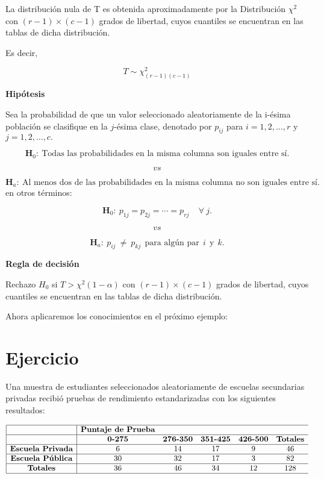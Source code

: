 \documentclass[
  a4paper,
  oneside,
  openany]{book}
\begin{document}
La distribución nula de T es obtenida aproximadamente por la Distribución \(\chi^2\) con \((r-1)\times(c-1)\) grados de libertad, cuyos cuantiles se encuentran en las tablas de dicha distribución.

Es decir,

\[T\sim \chi^2_{(r-1)(c-1)}\]

\textbf{Hipótesis}

Sea la probabilidad de que un valor seleccionado aleatoriamente de la i-ésima población se clasifique en la \(j\)-ésima clase, denotado por \(p_{ij}\) para \(i= 1, 2,\ldots,r\) y \(j=1,2,\ldots,c.\)

\[\textbf{H}_0: \ \mbox{Todas las probabilidades en la misma columna son iguales entre sí.}\]

\[vs\]

\[\textbf{H}_a: \ \mbox{Al menos dos de las probabilidades en la misma columna no son iguales entre sí.}\]
en otros términos:

\[\textbf{H}_0: \ p_{1j}=p_{2j}= \cdots=p_{rj} \ \ \ \ \  \forall\  j.\]

\[vs\]

\[\textbf{H}_a: \ p_{ij} \ \neq \  p_{kj} \ \ \mbox{para algún par} \ \  i \ \ \mbox{y} \ \ k.\]

\textbf{Regla de decisión}

Rechazo \(H_0\) si \(T> \chi^2(1-\alpha)\) con \((r-1)\times(c-1)\) grados de libertad, cuyos cuantiles se encuentran en las tablas de dicha distribución.

Ahora aplicaremos los conocimientos en el próximo ejemplo:

\hypertarget{ejercicio-1}{%
\section{Ejercicio}\label{ejercicio-1}}

Una muestra de estudiantes seleccionados aleatoriamente de escuelas secundarias privadas recibió pruebas de rendimiento estandarizadas con los siguientes resultados:

\[
\begin{array}{ |c|cc c c c c|}
\hline
&\textbf{Puntaje de Prueba}&&&&\\
\hline
&\textbf{0-275} & \textbf{276-350} & \textbf{351-425} & \textbf{426-500} & \textbf{Totales} \\
\hline
\textbf{Escuela Privada} & 6    & 14 & 17 & 9 & 46 \\
\hline
\textbf{Escuela Pública} & 30   & 32 & 17 & 3 & 82 \\
\hline
\textbf{Totales} & 36   & 46 & 34 & 12 & 128 \\
\hline
\end{array}
\]
\end{document}

